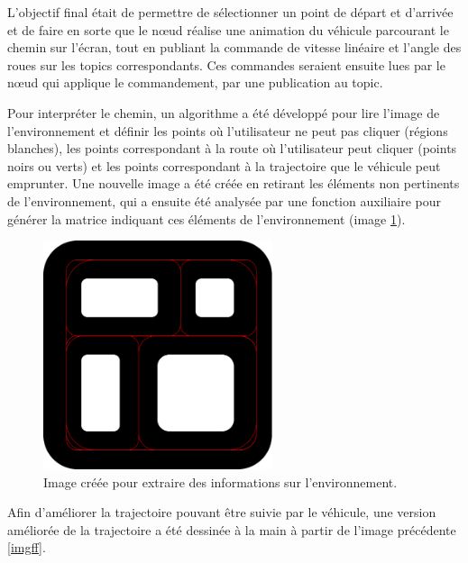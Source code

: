L'objectif final était de permettre de sélectionner un point de départ et d'arrivée et de faire en sorte que le nœud réalise une animation du véhicule parcourant le chemin sur l'écran, tout en publiant la commande de vitesse linéaire et l'angle des roues sur les topics correspondants. Ces commandes seraient ensuite lues par le nœud qui applique le commandement, par une publication au topic.

Pour interpréter le chemin, un algorithme a été développé pour lire l'image de l'environnement et définir les points où l'utilisateur ne peut pas cliquer (régions blanches), les points correspondant à la route où l'utilisateur peut cliquer (points noirs ou verts) et les points correspondant à la trajectoire que le véhicule peut emprunter. Une nouvelle image a été créée en retirant les éléments non pertinents de l'environnement, qui a ensuite été analysée par une fonction auxiliaire pour générer la matrice indiquant ces éléments de l'environnement (image \ref{AAA}).

\FloatBarrier
\begin{figure}[!h]
    \centering
    \includegraphics[width=0.6\textwidth]{img/background/trace_track.png} 
    \caption{Image créée pour extraire des informations sur l'environnement.}
    \label{AAA}
\end{figure}

Afin d'améliorer la trajectoire pouvant être suivie par le véhicule, une version améliorée de la trajectoire a été dessinée à la main à partir de l'image précédente \ref{imgff}. 


